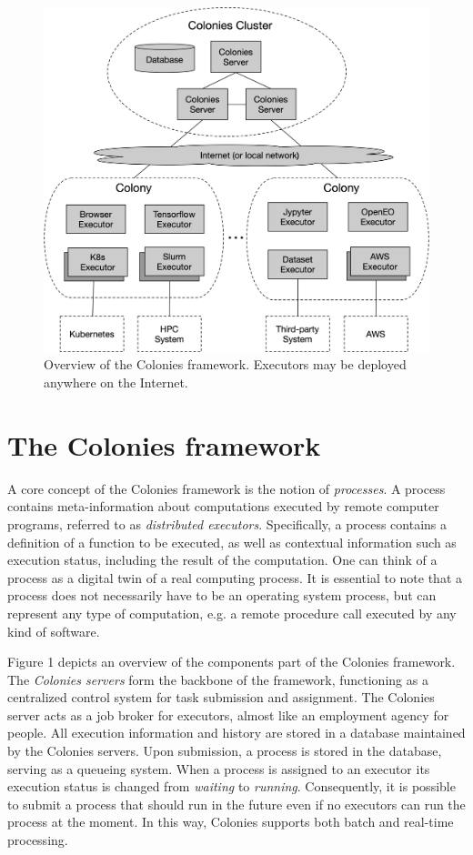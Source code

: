 \documentclass{article}
\begin{document}
\begin{figure}[t]
	\centering
    \includegraphics[scale=0.45]{overview.png}
	\caption{Overview of the Colonies framework. Executors may be deployed anywhere on the Internet.}
	\label{fig:overview}
\end{figure}

\section{The Colonies framework}
\label{sec:headings}
A core concept of the Colonies framework is the notion of \emph{processes}. A process contains meta-information about computations executed by remote computer programs, referred to as \emph{distributed executors}. Specifically, a process contains a definition of a function to be executed, as well as contextual information such as execution status, including the result of the computation. One can think of a process as a digital twin of a real computing process. It is essential to note that a process does not necessarily have to be an operating system process, but can represent any type of computation, e.g. a remote procedure call executed by any kind of software. 

Figure 1 depicts an overview of the components part of the Colonies framework. The \emph{Colonies servers} form the backbone of the framework, functioning as a centralized control system for task submission and assignment. The Colonies server acts as a job broker for executors, almost like an employment agency for people. All execution information and history are stored in a database maintained by the Colonies servers. Upon submission, a process is stored in the database, serving as a queueing system. When a process is assigned to an executor its execution status is changed from \emph{waiting} to \emph{running}. Consequently, it is possible to submit a process that should run in the future even if no executors can run the process at the moment. In this way, Colonies supports both batch and real-time processing. 
\end{document}
